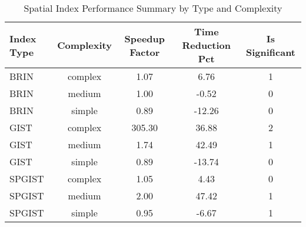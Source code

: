\begin{table}
\caption{Spatial Index Performance Summary by Type and Complexity}
\label{tab:spatial_performance_summary}
\begin{tabular}{lcccc}
\toprule
Index Type & Complexity & Speedup Factor & Time Reduction Pct & Is Significant \\
\midrule
BRIN & complex & 1.07 & 6.76 & 1 \\
BRIN & medium & 1.00 & -0.52 & 0 \\
BRIN & simple & 0.89 & -12.26 & 0 \\
GIST & complex & 305.30 & 36.88 & 2 \\
GIST & medium & 1.74 & 42.49 & 1 \\
GIST & simple & 0.89 & -13.74 & 0 \\
SPGIST & complex & 1.05 & 4.43 & 0 \\
SPGIST & medium & 2.00 & 47.42 & 1 \\
SPGIST & simple & 0.95 & -6.67 & 1 \\
\bottomrule
\end{tabular}
\end{table}
